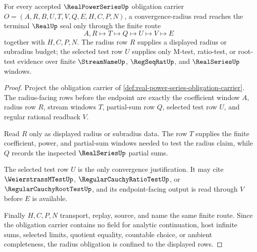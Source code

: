 \begin{theorem}
\label{thm:real-power-series-radius-obligation}
For every accepted $\RealPowerSeriesUp$ obligation carrier $O=(A,R,B,U,T,V,Q,E,H,C,P,N)$, a convergence-radius read reaches the terminal $\RealUp$ seal only through the finite route
$$
A,R \longmapsto T \longmapsto Q \longmapsto U \longmapsto V \longmapsto E
$$
together with $H,C,P,N$. The radius row $R$ supplies a displayed radius or subradius budget; the selected test row $U$ supplies only M-test, ratio-test, or root-test evidence over finite $\StreamNameUp$, $\RegSeqRatUp$, and $\RealSeriesUp$ windows.
\end{theorem}
\begin{proof}
Project the obligation carrier of \autoref{def:real-power-series-obligation-carrier}. The radius-facing rows before the endpoint are exactly the coefficient window $A$, radius row $R$, stream windows $T$, partial-sum row $Q$, selected test row $U$, and regular rational readback $V$.

Read $R$ only as displayed radius or subradius data. The row $T$ supplies the finite coefficient, power, and partial-sum windows needed to test the radius claim, while $Q$ records the inspected $\RealSeriesUp$ partial sums.

The selected test row $U$ is the only convergence justification. It may cite $\WeierstrassMTestUp$, $\RegularCauchyRatioTestUp$, or $\RegularCauchyRootTestUp$, and its endpoint-facing output is read through $V$ before $E$ is available.

Finally $H,C,P,N$ transport, replay, source, and name the same finite route. Since the obligation carrier contains no field for analytic continuation, host infinite sums, selected limits, quotient equality, countable choice, or ambient completeness, the radius obligation is confined to the displayed rows.
\end{proof}

